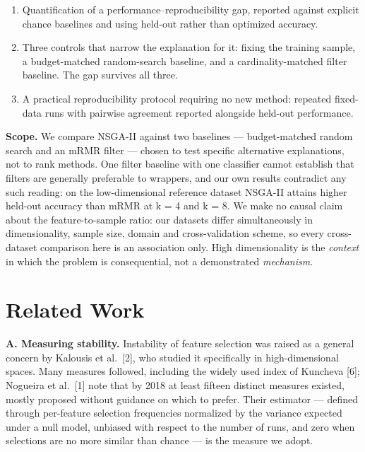\documentclass[conference]{IEEEtran}
\providecommand{\tightlist}{\setlength{\itemsep}{0pt}\setlength{\parskip}{0pt}}
\begin{document}
\begin{enumerate}
\def\labelenumi{\arabic{enumi}.}
\tightlist
\item
  Quantification of a performance--reproducibility gap, reported against explicit chance baselines and using held-out rather than optimized accuracy.
\item
  Three controls that narrow the explanation for it: fixing the training sample, a budget-matched random-search baseline, and a cardinality-matched filter baseline. The gap survives all three.
\item
  A practical reproducibility protocol requiring no new method: repeated fixed-data runs with pairwise agreement reported alongside held-out performance.
\end{enumerate}

\textbf{Scope.} We compare NSGA-II against two baselines --- budget-matched random search and an mRMR filter --- chosen to test specific alternative explanations, not to rank methods. One filter baseline with one classifier cannot establish that filters are generally preferable to wrappers, and our own results contradict any such reading: on the low-dimensional reference dataset NSGA-II attains higher held-out accuracy than mRMR at k = 4 and k = 8. We make no causal claim about the feature-to-sample ratio: our datasets differ simultaneously in dimensionality, sample size, domain and cross-validation scheme, so every cross-dataset comparison here is an association only. High dimensionality is the \emph{context} in which the problem is consequential, not a demonstrated \emph{mechanism}.



\section{Related Work}

\textbf{A. Measuring stability.} Instability of feature selection was raised as a general concern by Kalousis et al.~[2], who studied it specifically in high-dimensional spaces. Many measures followed, including the widely used index of Kuncheva [6]; Nogueira et al.~[1] note that by 2018 at least fifteen distinct measures existed, mostly proposed without guidance on which to prefer. Their estimator --- defined through per-feature selection frequencies normalized by the variance expected under a null model, unbiased with respect to the number of runs, and zero when selections are no more similar than chance --- is the measure we adopt.
\end{document}
